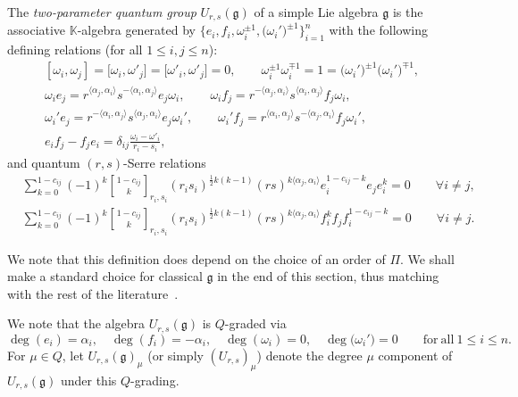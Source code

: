 \documentclass[10pt,a4paper]{amsart}
\numberwithin{equation}{section}
\newcommand{\qbinom}{\genfrac{[}{]}{0pt}{}}
\newcommand{\fg}{\mathfrak{g}}
\begin{document}
\begin{Definition}\label{def:general_2param}
The \textit{two-parameter quantum group} $U_{r,s}(\fg)$ of a simple Lie algebra $\fg$ is the associative $\mathbb{K}$-algebra generated by $\bigl\{e_{i},f_{i},\omega_{i}^{\pm 1},\bigl(\omega_{i}'\bigr)^{\pm 1}\bigr\}_{i=1}^{n}$ with the following defining relations (for all $1\leq i,j\leq n$):
\begin{gather}\label{eq:R1}
 [\omega_i,\omega_j]=\bigl[\omega_i,\omega'_j\bigr]=\bigl[\omega'_i,\omega'_j\bigr]=0, \qquad
 \omega_{i}^{\pm 1}\omega_{i}^{\mp 1} = 1 = \bigl(\omega_{i}'\bigr)^{\pm 1}\bigl(\omega_{i}'\bigr)^{\mp 1},
\\ \label{eq:R2}
 \omega_{i}e_{j} = r^{\langle \alpha_{j},\alpha_{i}\rangle}s^{-\langle \alpha_{i},\alpha_{j}\rangle}e_{j}\omega_{i}, \qquad
 \omega_{i}f_{j} = r^{-\langle \alpha_{j},\alpha_{i}\rangle}s^{\langle \alpha_{i},\alpha_{j}\rangle}f_{j}\omega_{i},
\\ \label{eq:R3}
 \omega_{i}'e_{j} = r^{-\langle \alpha_{i},\alpha_{j}\rangle}s^{\langle \alpha_{j},\alpha_{i}\rangle}e_{j}\omega_{i}', \qquad
 \omega_{i}'f_{j} = r^{\langle \alpha_{i},\alpha_{j}\rangle}s^{-\langle \alpha_{j},\alpha_{i}\rangle}f_{j}\omega_{i}',
\\ \label{eq:R4}
 e_{i}f_{j} - f_{j}e_{i} = \delta_{ij}\frac{\omega_i-\omega'_i}{r_{i} - s_{i}},
\end{gather}
and quantum $(r,s)$-Serre relations
\begin{align}
 &\sum_{k = 0}^{1 - c_{ij}}(-1)^k\qbinom{1 - c_{ij}}{k}_{r_{i},s_{i}}(r_{i}s_{i})^{\frac{1}{2}k(k-1)}(rs)^{k\langle \alpha_{j},\alpha_{i}\rangle}e_{i}^{1 - c_{ij} - k}e_{j}e_{i}^{k}=0
 \qquad \forall i\ne j, \nonumber\\
 &\sum_{k = 0}^{1 - c_{ij}}(-1)^k\qbinom{1 - c_{ij}}{k}_{r_{i},s_{i}}(r_{i}s_{i})^{\frac{1}{2}k(k-1)}(rs)^{k\langle \alpha_{j},\alpha_{i}\rangle} f_{i}^{k}f_{j}f_{i}^{1 - c_{ij} - k}=0
 \qquad \forall i\ne j.\label{eq:R5}
\end{align}
\end{Definition}

\begin{Remark}
We note that this definition does depend on the choice of an order of $\Pi$. We shall make a standard choice for classical $\fg$ in the end of this section, thus matching with the rest of the literature~\cite{BW1,BGH1}.
\end{Remark}

We note that the algebra $U_{r,s}(\mathfrak{g})$ is $Q$-graded via
\begin{displaymath}
 \deg(e_{i})=\alpha_i,\quad \deg(f_i)=-\alpha_i, \quad
 \deg(\omega_{i})=0, \quad \deg\bigl(\omega_{i}'\bigr)=0 \qquad \mathrm{for\ all} \ 1\leq i\leq n.
\end{displaymath}
For $\mu\in Q$, let $U_{r,s}(\fg)_{\mu}$ \big(or simply $(U_{r,s})_{\mu}$\big) denote the degree $\mu$ component of $U_{r,s}(\fg)$ under this $Q$-grading.
\end{document}
